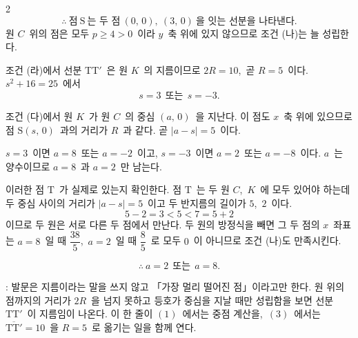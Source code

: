 \documentclass[10pt,fleqn]{article}
\begin{document}
\begin{multicols*}{2}
$$\therefore\ \text{점}\ \mathrm{S}\ \text{는 두 점}\ (0,\,0),\ (3,\,0)\ \text{을 잇는 선분을 나타낸다.}$$
원 $C$\ 위의 점은 모두 $p\ge 4>0$\ 이라 $y$\ 축 위에 있지 않으므로 조건 (나)는 늘 성립한다.

 조건 (라)에서 선분 $\mathrm{TT}'$\ 은 원 $K$\ 의 지름이므로 \mbox{$2R=10$},\ 곧 \mbox{$R=5$}\ 이다. $s^{2}+16=25$\ 에서
$$s=3\ \ \text{또는}\ \ s=-3.$$

조건 (다)에서 원 $K$\ 가 원 $C$\ 의 중심 $(a,\,0)$\ 을 지난다. 이 점도 $x$\ 축 위에 있으므로 점 $\mathrm{S}(s,\,0)$\ 과의 거리가 $R$\ 과 같다. 곧 $|a-s|=5$\ 이다.

$s=3$\ 이면 $a=8$\ 또는 $a=-2$\ 이고, $s=-3$\ 이면 $a=2$\ 또는 $a=-8$\ 이다. $a$\ 는 양수이므로 $a=8$\ 과 $a=2$\ 만 남는다.

이러한 점 $\mathrm{T}$\ 가 실제로 있는지 확인한다. 점 $\mathrm{T}$\ 는 두 원 $C$,\ $K$\ 에 모두 있어야 하는데 두 중심 사이의 거리가 $|a-s|=5$\ 이고 두 반지름의 길이가 $5$,\ $2$\ 이다.
$$5-2=3<5<7=5+2$$
이므로 두 원은 서로 다른 두 점에서 만난다. 두 원의 방정식을 빼면 그 두 점의 $x$\ 좌표는 $a=8$\ 일 때 $\dfrac{38}{5}$,\ $a=2$\ 일 때 $\dfrac{8}{5}$\ 로 모두 $0$\ 이 아니므로 조건 (나)도 만족시킨다.

$$\therefore\ a=2\ \ \text{또는}\ \ a=8.$$

\begin{dmcriticalpoint}
: 발문은 지름이라는 말을 쓰지 않고 「가장 멀리 떨어진 점」이라고만 한다. 원 위의 점까지의 거리가 $2R$\ 을 넘지 못하고 등호가 중심을 지날 때만 성립함을 보면 선분 $\mathrm{TT}'$\ 이 지름임이 나온다. 이 한 줄이 $(1)$\ 에서는 중점 계산을,\ $(3)$\ 에서는 $\overline{\mathrm{TT}'}=10$\ 을 $R=5$\ 로 옮기는 일을 함께 연다.
\end{dmcriticalpoint}


\end{multicols*}
\end{document}
